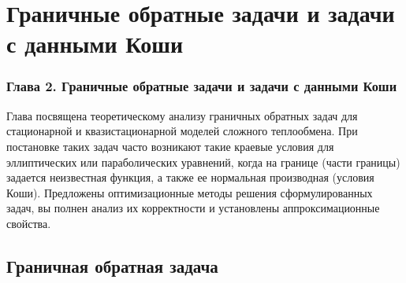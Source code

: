 \section{Граничные обратные задачи и задачи с данными Коши}\label{sec:rev}
\begin{frame}
    \frametitle{Глава 2. Граничные обратные задачи и задачи с данными Коши}
    Глава посвящена теоретическому анализу граничных обратных задач для
    стационарной и квазистационарной моделей сложного теплообмена.
    При постановке таких задач часто возникают такие краевые условия для эллиптических
    или параболических уравнений, когда на границе (части границы) задается
    неизвестная функция, а также ее нормальная производная (условия Коши).
    Предложены оптимизационные методы решения сформулированных задач, вы
    полнен анализ их корректности и установлены аппроксимационные свойства.
\end{frame}

\subsection{Граничная обратная задача}\label{subsec:rev}

